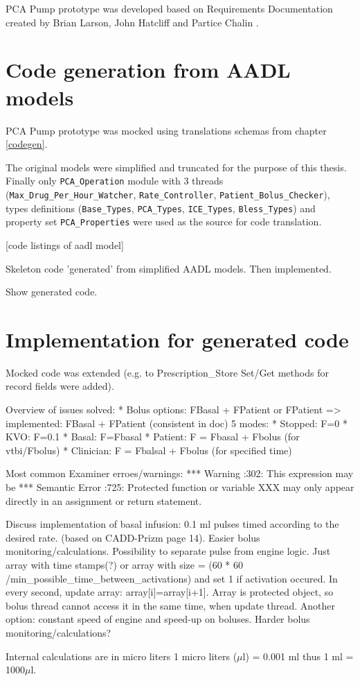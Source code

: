 PCA Pump prototype was developed based on Requirements Documentation created by Brian Larson, John Hatcliff and Partice Chalin \cite{PcaReq}.


\section{Code generation from AADL models}

PCA Pump prototype was mocked using translations schemas from chapter \ref{codegen}.

The original models were simplified and truncated for the purpose of this thesis. Finally only \lstinline{PCA_Operation} module with 3 threads (\lstinline{Max_Drug_Per_Hour_Watcher}, \lstinline{Rate_Controller}, \lstinline{Patient_Bolus_Checker}), types definitions (\lstinline{Base_Types}, \lstinline{PCA_Types}, \lstinline{ICE_Types}, \lstinline{Bless_Types}) and property set \lstinline{PCA_Properties} were used as the source for code translation.

[code listings of aadl model]


Skeleton code 'generated' from simplified AADL models. Then implemented.

Show generated code.



\section{Implementation for generated code}

Mocked code was extended (e.g. to Prescription\_Store Set/Get methods for record fields were added).

Overview of issues solved: 
* Bolus options: FBasal + FPatient or FPatient => implemented: FBasal + FPatient (consistent in doc)
5 modes:
* Stopped: F=0
* KVO: F=0.1
* Basal: F=Fbasal
* Patient: F = Fbasal + Fbolus (for vtbi/Fbolus)
* Clinician: F = Fbalsal + Fbolus (for specified time)

Most common Examiner\cite{Examiner:Online} erroes/warnings:
***        Warning                     :302: This expression may be
***        Semantic Error              :725: Protected function or variable XXX may only appear directly in an assignment or return statement.

Discuss implementation of basal infusion: 0.1 ml pulses timed according to the desired rate. (based on CADD-Prizm page 14). Easier bolus monitoring/calculations. Possibility to separate pulse from engine logic. Just array with time stamps(?) or array with size = (60 * 60 /min\_possible\_time\_between\_activations) and set 1 if activation occured. In every second, update array: array[i]=array[i+1]. Array is protected object, so bolus thread cannot access it in the same time, when update thread.
Another option: constant speed of engine and speed-up on boluses. Harder bolus monitoring/calculations?


Internal calculations are in micro liters 1 micro liters ($\mu$l) = 0.001 ml thus 1 ml = 1000$\mu$l.


